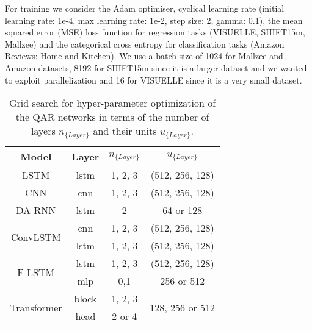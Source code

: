\documentclass{article}
\begin{document}
For training we consider the Adam optimiser, cyclical learning rate \cite{smith2017cyclical} (initial learning rate: 1e-4, max learning rate: 1e-2, step size: 2, gamma: 0.1), the mean squared error (MSE) loss function for regression tasks (VISUELLE, SHIFT15m, Mallzee) and the categorical cross entropy for classification tasks (Amazon Reviews: Home and Kitchen).
We use a batch size of 1024 for Mallzee and Amazon datasets, 8192 for SHIFT15m since it is a larger dataset and we wanted to exploit parallelization and 16 for VISUELLE since it is a very small dataset.

\begin{table}
\centering
  \caption{Grid search for hyper-parameter optimization of the QAR networks in terms of the number of layers $n_{\{Layer\}}$ and their units $u_{\{Layer\}}$.}
  \label{tab:gridsearch}
  \begin{tabular}{c|c|c|c}
    \toprule
     \multicolumn{1}{c}{Model} & 
     \multicolumn{1}{c}{Layer} & 
     \multicolumn{1}{c}{$n_{\{Layer\}}$} & 
     \multicolumn{1}{c}{$u_{\{Layer\}}$}
     \\
     \midrule
     
     LSTM & lstm & 1, 2, 3 & (512, 256, 128) \\
     \midrule
     CNN & cnn & 1, 2, 3 & (512, 256, 128) \\
     \midrule
     
     DA-RNN & lstm & 2 & 64 or 128 \\
     \midrule
     
      \multirow{2}{*}{ConvLSTM} & cnn & 1, 2, 3 & (512, 256, 128) \\
      & lstm & 1, 2, 3 & (512, 256, 128) \\
    \midrule
    
    \multirow{2}{*}{F-LSTM} & lstm & 1, 2, 3 & (512, 256, 128) \\
    & mlp & 0,1 & 256 or 512 \\
     \midrule
     
    \multirow{2}{*}{Transformer} & block & 1, 2, 3 & \multirow{2}{*}{128, 256 or 512} \\
    & head & 2 or 4 &  \\
    
    
     
    \bottomrule
  \end{tabular}
  
\end{table}
\end{document}
